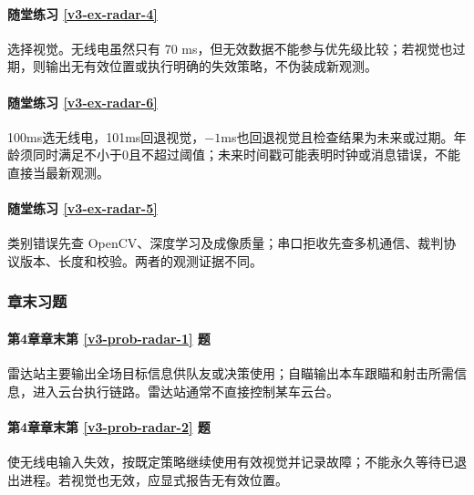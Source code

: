 \paragraph*{随堂练习 \ref{v3-ex-radar-4}}
\begin{solution}
选择视觉。无线电虽然只有 70 ms，但无效数据不能参与优先级比较；若视觉也过期，则输出无有效位置或执行明确的失效策略，不伪装成新观测。
\end{solution}

\paragraph*{随堂练习 \ref{v3-ex-radar-6}}
\begin{solution}
100ms选无线电，101ms回退视觉，$-1$ms也回退视觉且检查结果为未来或过期。年龄须同时满足不小于0且不超过阈值；未来时间戳可能表明时钟或消息错误，不能直接当最新观测。
\end{solution}

\paragraph*{随堂练习 \ref{v3-ex-radar-5}}
\begin{solution}
类别错误先查 OpenCV、深度学习及成像质量；串口拒收先查多机通信、裁判协议版本、长度和校验。两者的观测证据不同。
\end{solution}

\subsubsection*{章末习题}
\paragraph*{第4章章末第 \ref{v3-prob-radar-1} 题}
\begin{solution}
雷达站主要输出全场目标信息供队友或决策使用；自瞄输出本车跟瞄和射击所需信息，进入云台执行链路。雷达站通常不直接控制某车云台。
\end{solution}

\paragraph*{第4章章末第 \ref{v3-prob-radar-2} 题}
\begin{solution}
使无线电输入失效，按既定策略继续使用有效视觉并记录故障；不能永久等待已退出进程。若视觉也无效，应显式报告无有效位置。
\end{solution}


